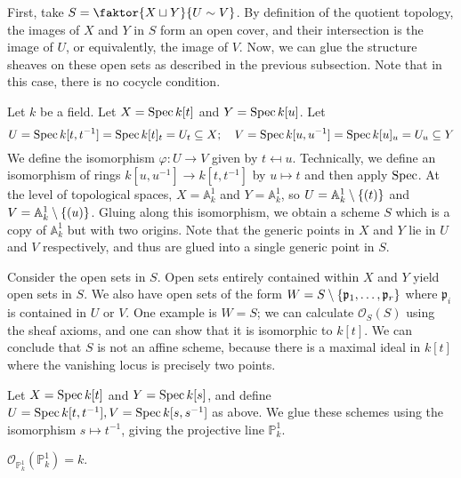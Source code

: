 First, take \( S = \faktor{X \sqcup Y}{U \sim V} \).
By definition of the quotient topology, the images of \( X \) and \( Y \) in \( S \) form an open cover, and their intersection is the image of \( U \), or equivalently, the image of \( V \).
Now, we can glue the structure sheaves on these open sets as described in the previous subsection.
Note that in this case, there is no cocycle condition.
\begin{example}
    Let \( k \) be a field.
    Let \( X = \operatorname{Spec} k[t] \) and \( Y = \operatorname{Spec} k[u] \).
    Let
    \[ U = \operatorname{Spec} k[t, t^{-1}] = \operatorname{Spec} k[t]_t = U_t \subseteq X;\quad V = \operatorname{Spec} k[u, u^{-1}] = \operatorname{Spec} k[u]_u = U_u \subseteq Y \]
    We define the isomorphism \( \varphi : U \to V \) given by \( t \mapsfrom u \).
    Technically, we define an isomorphism of rings \( k[u, u^{-1}] \to k[t, t^{-1}] \) by \( u \mapsto t \) and then apply \( \operatorname{Spec} \).
    At the level of topological spaces, \( X = \mathbb A^1_k \) and \( Y = \mathbb A^1_k \), so \( U = \mathbb A^1_k \setminus \qty{(t)} \) and \( V = \mathbb A^1_k \setminus \qty{(u)} \).
    Gluing along this isomorphism, we obtain a scheme \( S \) which is a copy of \( \mathbb A^1_k \) but with two origins.
    Note that the generic points in \( X \) and \( Y \) lie in \( U \) and \( V \) respectively, and thus are glued into a single generic point in \( S \).

    Consider the open sets in \( S \).
    Open sets entirely contained within \( X \) and \( Y \) yield open sets in \( S \).
    We also have open sets of the form \( W = S \setminus \qty{\mathfrak p_1, \dots, \mathfrak p_r} \) where \( \mathfrak p_i \) is contained in \( U \) or \( V \).
    One example is \( W = S \); we can calculate \( \mathcal O_S(S) \) using the sheaf axioms, and one can show that it is isomorphic to \( k[t] \).
    We can conclude that \( S \) is not an affine scheme, because there is a maximal ideal in \( k[t] \) where the vanishing locus is precisely two points.
\end{example}
\begin{example}
    Let \( X = \operatorname{Spec} k[t] \) and \( Y = \operatorname{Spec} k[s] \), and define \( U = \operatorname{Spec} k[t,t^{-1}], V = \operatorname{Spec} k[s,s^{-1}] \) as above.
    We glue these schemes using the isomorphism \( s \mapsto t^{-1} \), giving the projective line \( \mathbb P^1_k \).
\end{example}
\begin{proposition}
    \( \mathcal O_{\mathbb P^1_k}(\mathbb P^1_k) = k \).
\end{proposition}
